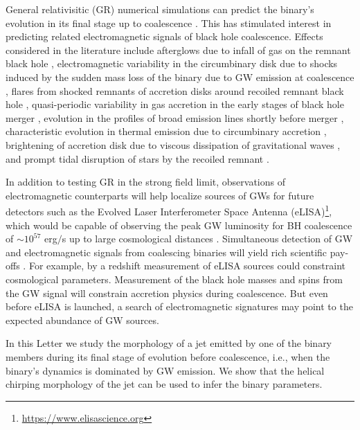 \documentclass[a4paper,fleqn,usenatbib]{mnras}
\begin{document}
General relativisitic (GR) numerical simulations can predict the
binary's evolution in its final stage up to coalescence
\citep{2005PhRvL..95l1101P, 2006PhRvL..96k1102B, 2006PhRvL..96k1101C}.
This has stimulated interest in predicting related electromagnetic
signals of black hole coalescence.  Effects considered in the
literature include afterglows due to infall of gas on the remnant
black hole \citep{2005ApJ...622L..93M}, electromagnetic variability in
the circumbinary disk due to shocks induced by the sudden mass loss of
the binary due to GW emission at coalescence
\citep{2007APS..APR.S1010B}, flares from shocked remnants of accretion
disks around recoiled remnant black hole \citep{2007PhRvL..99d1103L,
  2008ApJ...682..758S, 2009CQGra..26i4032H}, quasi-periodic
variability in gas accretion in the early stages of black hole merger
\citep{2008ApJ...672...83M, 2009CQGra..26i4032H, 2012MNRAS.427.2680K},
evolution in the profiles of broad emission lines shortly before
merger \citep{2013MNRAS.432.1468M}, characteristic evolution in
thermal emission due to circumbinary accretion
\citep{2015MNRAS.446L..36F}, brightening of accretion disk due to
viscous dissipation of gravitational waves
\citep{2008PhRvL.101d1101K}, and prompt tidal disruption of stars by
the recoiled remnant \citep{2011MNRAS.412...75S}.

In addition to testing GR in the strong field limit, observations of
electromagnetic counterparts will help localize sources of GWs for
future detectors such as the Evolved Laser Interferometer Space
Antenna (eLISA)\footnote{\url{https://www.elisascience.org}}, which would be
capable of observing the peak GW luminosity for BH coalescence of
$\sim 10^{57}$ erg$/$s up to large cosmological distances
\citep{2003CQGra..20S..65H, 2013CQGra..30x4009S}.  Simultaneous
detection of GW and electromagnetic signals from coalescing binaries
will yield rich scientific pay-offs \citep{2003CQGra..20S..65H,
  2005ApJ...629...15H}.  For example, by a redshift measurement of
eLISA sources could constraint cosmological parameters.  Measurement
of the black hole masses and spins from the GW signal will constrain
accretion physics during coalescence.  But even before eLISA is
launched, a search of electromagnetic signatures may point to the
expected abundance of GW sources.

In this Letter we study the morphology of a jet emitted by one of the
binary members during its final stage of evolution before coalescence,
i.e., when the binary's dynamics is dominated by GW emission.  We show
that the helical chirping morphology of the jet can be used to infer
the binary parameters.
\end{document}
